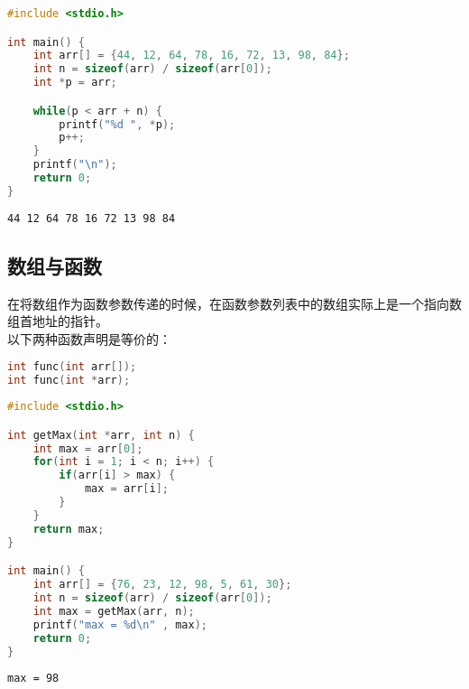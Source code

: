 
\begin{lstlisting}[language=C]
#include <stdio.h>

int main() {
    int arr[] = {44, 12, 64, 78, 16, 72, 13, 98, 84};
    int n = sizeof(arr) / sizeof(arr[0]);
    int *p = arr;

    while(p < arr + n) {
        printf("%d ", *p);
        p++;
    }
    printf("\n");
    return 0;
}
\end{lstlisting}

\begin{tcolorbox}
	\begin{verbatim}
44 12 64 78 16 72 13 98 84
	\end{verbatim}
\end{tcolorbox}

\vspace{0.5cm}

\subsection{数组与函数}

在将数组作为函数参数传递的时候，在函数参数列表中的数组实际上是一个指向数组首地址的指针。\\

以下两种函数声明是等价的：

\vspace{-0.5cm}

\begin{lstlisting}[language=C]
int func(int arr[]);
int func(int *arr);
\end{lstlisting}

\vspace{0.5cm}


\begin{lstlisting}[language=C]
#include <stdio.h>

int getMax(int *arr, int n) {
    int max = arr[0];
    for(int i = 1; i < n; i++) {
        if(arr[i] > max) {
            max = arr[i];
        }
    }
    return max;
}

int main() {
    int arr[] = {76, 23, 12, 98, 5, 61, 30};
    int n = sizeof(arr) / sizeof(arr[0]);
    int max = getMax(arr, n);
    printf("max = %d\n" , max);
    return 0;
}
\end{lstlisting}

\begin{tcolorbox}
	\begin{verbatim}
max = 98
	\end{verbatim}
\end{tcolorbox}

